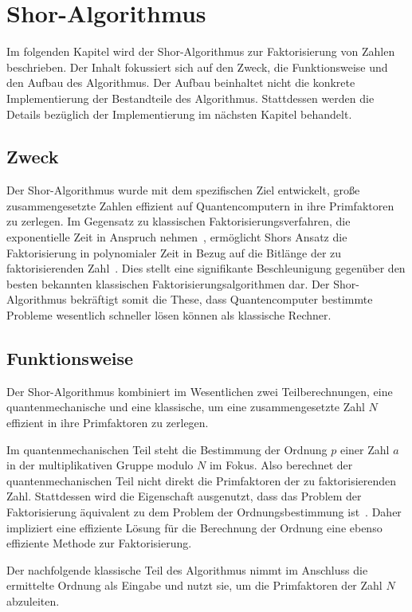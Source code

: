 \section{Shor-Algorithmus}
Im folgenden Kapitel wird der Shor-Algorithmus zur Faktorisierung von Zahlen beschrieben. 
Der Inhalt fokussiert sich auf den Zweck, die Funktionsweise und den Aufbau des Algorithmus. 
Der Aufbau beinhaltet nicht die konkrete Implementierung der Bestandteile des Algorithmus. 
Stattdessen werden die Details bezüglich der Implementierung im nächsten Kapitel behandelt.

\subsection{Zweck}
Der Shor-Algorithmus wurde mit dem spezifischen Ziel entwickelt, 
große zusammengesetzte Zahlen effizient auf Quantencomputern in ihre Primfaktoren zu zerlegen. 
Im Gegensatz zu klassischen Faktorisierungsverfahren, 
die exponentielle Zeit in Anspruch nehmen~\cite{katz2023}, 
ermöglicht Shors Ansatz die Faktorisierung in polynomialer Zeit in Bezug auf die Bitlänge der zu faktorisierenden Zahl~\cite{Shor_1997}. 
Dies stellt eine signifikante Beschleunigung gegenüber den besten bekannten klassischen Faktorisierungsalgorithmen dar. 
Der Shor-Algorithmus bekräftigt somit die These, 
dass Quantencomputer bestimmte Probleme wesentlich schneller lösen können als klassische Rechner.

\subsection{Funktionsweise} \label{Funktionsweise}
Der Shor-Algorithmus kombiniert im Wesentlichen zwei Teilberechnungen, 
eine quantenmechanische und eine klassische, 
um eine zusammengesetzte Zahl \(N\) effizient in ihre Primfaktoren zu zerlegen.

Im quantenmechanischen Teil steht die Bestimmung der Ordnung \(p\) einer Zahl \(a\) 
in der multiplikativen Gruppe modulo \(N\) im Fokus. 
Also berechnet der quantenmechanischen Teil nicht direkt die Primfaktoren der zu faktorisierenden Zahl.
Stattdessen wird die Eigenschaft ausgenutzt, 
dass das Problem der Faktorisierung äquivalent zu dem Problem der Ordnungsbestimmung ist~\cite[226,633]{nielsen_chuang_2010}.
Daher impliziert eine effiziente Lösung für die Berechnung der Ordnung eine ebenso effiziente Methode zur Faktorisierung.

Der nachfolgende klassische Teil des Algorithmus nimmt im Anschluss die ermittelte Ordnung als Eingabe und nutzt sie, 
um die Primfaktoren der Zahl \(N\) abzuleiten.

